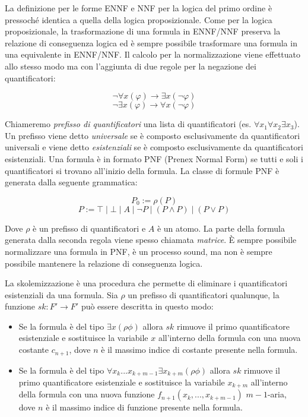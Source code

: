 \documentclass[./main.tex]{subfiles}
\begin{document}
La definizione per le forme ENNF e NNF per la logica del primo ordine è pressoché identica a quella della logica proposizionale.
Come per la logica proposizionale, la trasformazione di una formula in ENNF/NNF preserva la relazione di conseguenza logica ed è sempre
possibile trasformare una formula in una equivalente in ENNF/NNF. 
Il calcolo per la normalizzazione viene effettuato allo stesso modo ma con l'aggiunta di due regole per la negazione dei quantificatori:

$$ \lnot \forall x (\varphi) \rightarrow \exists x (\lnot \varphi) $$
$$ \lnot \exists x (\varphi) \rightarrow \forall x (\lnot \varphi) $$


Chiameremo \textit{prefisso di quantificatori} una lista di quantificatori (es. $\forall x_1 \forall x_2 \exists x_3$). 
Un prefisso viene detto \textit{universale} se è composto esclusivamente da quantificatori universali e viene detto \textit{esistenziali} 
se è composto esclusivamente da quantificatori esistenziali. Una formula è in formato PNF (Prenex Normal Form) se tutti e soli 
i quantificatori si trovano all'inizio della formula. La classe di formule PNF è generata dalla seguente grammatica:

$$ P_0 := \rho(P) $$
$$ P := \top \mid \bot \mid A \mid \lnot P \mid (P \land P) \mid (P \lor P) $$

Dove $\rho$ è un prefisso di quantificatori e $A$ è un atomo.
La parte della formula generata dalla seconda regola viene spesso chiamata \textit{matrice}.
È sempre possibile normalizzare una formula in PNF, è un processo sound, ma non è sempre possibile mantenere la relazione di conseguenza logica.


La skolemizzazione è una procedura che permette di eliminare i quantificatori esistenziali da una formula. 
Sia $\rho$ un prefisso di quantificatori qualunque, la funzione $sk : F' \rightarrow F'$ può essere descritta in questo modo:

\begin{itemize}
  \item Se la formula è del tipo $\exists x(\rho \phi)$ allora $sk$ rimuove il primo quantificatore esistenziale e sostituisce 
  la variabile $x$ all'interno della formula con una nuova costante $c_{n+1}$, dove $n$ è il massimo indice di costante presente nella formula.

  \item Se la formula è del tipo $\forall x_k ... x_{k+m-1} \exists x_{k+m} (\rho \phi)$ allora $sk$ rimuove 
  il primo quantificatore esistenziale e sostituisce la variabile $x_{k+m}$ all'interno della formula con una nuova funzione 
  $f_{n+1}(x_k, ... , x_{k+m-1})$
  $m-1$-aria, dove $n$ è il massimo indice di funzione presente nella formula.
\end{itemize}
\end{document}
